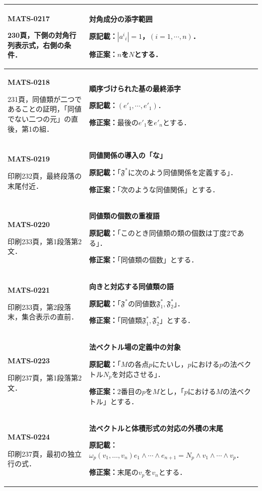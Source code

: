 \documentclass[a4paper,10pt]{ltjsarticle}
\begin{document}
\begin{longtable}{@{}>{\raggedright\arraybackslash}p{.19\linewidth}>{\raggedright\arraybackslash}p{.77\linewidth}@{}}
\hline
\hypertarget{MATS-0217}{}\textbf{MATS-0217}\par 230頁，下側の対角行列表示式，右側の条件． & \textbf{対角成分の添字範囲}\par\textbf{原記載：}$|a^i{}_i|=1$，$(i=1,\cdots,n)$．\par\textbf{修正案：}$n$を$N$とする． \\[3pt]
\hline
\hypertarget{MATS-0218}{}\textbf{MATS-0218}\par 231頁，同値類が二つであることの証明，「同値でない二つの元」の直後，第1の組． & \textbf{順序づけられた基の最終添字}\par\textbf{原記載：}$(e'_1,\cdots,e'_1)$．\par\textbf{修正案：}最後の$e'_1$を$e'_n$とする． \\[3pt]
\hline
\hypertarget{MATS-0219}{}\textbf{MATS-0219}\par 印刷232頁，最終段落の末尾付近． & \textbf{同値関係の導入の「な」}\par\textbf{原記載：}「$\mathfrak F^*$に次のよう同値関係を定義する」．\par\textbf{修正案：}「次のような同値関係」とする． \\[3pt]
\hline
\hypertarget{MATS-0220}{}\textbf{MATS-0220}\par 印刷233頁，第1段落第2文． & \textbf{同値類の個数の重複語}\par\textbf{原記載：}「このとき同値類の類の個数は丁度2である」．\par\textbf{修正案：}「同値類の個数」とする． \\[3pt]
\hline
\hypertarget{MATS-0221}{}\textbf{MATS-0221}\par 印刷233頁，第2段落末，集合表示の直前． & \textbf{向きと対応する同値類の語}\par\textbf{原記載：}「$\mathfrak F^*$の同値数$\mathfrak F_1^*,\mathfrak F_2^*$」．\par\textbf{修正案：}「同値類$\mathfrak F_1^*,\mathfrak F_2^*$」とする． \\[3pt]
\hline
\hypertarget{MATS-0223}{}\textbf{MATS-0223}\par 印刷237頁，第1段落第2文． & \textbf{法ベクトル場の定義中の対象}\par\textbf{原記載：}「$M$の各点$p$にたいし，$p$における$p$の法ベクトル$N_p$を対応させる」．\par\textbf{修正案：}2番目の$p$を$M$とし，「$p$における$M$の法ベクトル」とする． \\[3pt]
\hline
\hypertarget{MATS-0224}{}\textbf{MATS-0224}\par 印刷237頁，最初の独立行の式． & \textbf{法ベクトルと体積形式の対応の外積の末尾}\par\textbf{原記載：}$\omega_p(v_1,\ldots,v_n)e_1\wedge\cdots\wedge e_{n+1}=N_p\wedge v_1\wedge\cdots\wedge v_p$．\par\textbf{修正案：}末尾の$v_p$を$v_n$とする． \\[3pt]

\end{longtable}
\end{document}
